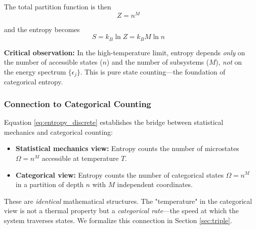 \documentclass[twocolumn,10pt]{article}
\theoremstyle{remark}
\begin{document}
The total partition function is then
\begin{equation}
    Z = n^M
    \label{eq:total_partition_discrete}
\end{equation}

and the entropy becomes
\begin{equation}
    S = k_B \ln Z = k_B M \ln n
    \label{eq:entropy_discrete}
\end{equation}

\textbf{Critical observation:} In the high-temperature limit, entropy depends \textit{only} on the number of accessible states ($n$) and the number of subsystems ($M$), \textit{not} on the energy spectrum $\{\epsilon_j\}$. This is pure state counting—the foundation of categorical entropy.

\subsubsection{Connection to Categorical Counting}

Equation \eqref{eq:entropy_discrete} establishes the bridge between statistical mechanics and categorical counting:
\begin{itemize}
    \item \textbf{Statistical mechanics view:} Entropy counts the number of microstates $\Omega = n^M$ accessible at temperature $T$.

    \item \textbf{Categorical view:} Entropy counts the number of categorical states $\Omega = n^M$ in a partition of depth $n$ with $M$ independent coordinates.
\end{itemize}

These are \textit{identical} mathematical structures. The "temperature" in the categorical view is not a thermal property but a \textit{categorical rate}—the speed at which the system traverses states. We formalize this connection in Section \ref{sec:triple}.
\end{document}
